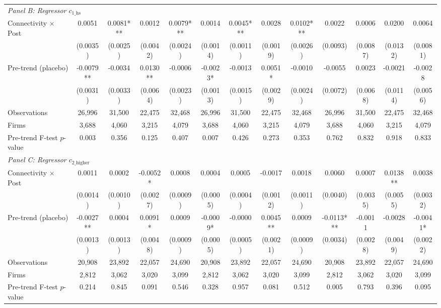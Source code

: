 \begin{table}[H]
{\begin{tabular}{lcccccccccccc}
\multicolumn{13}{l}{\textit{Panel B: Regressor $c_{\text{1\_hs}}$}} \\
\quad Connectivity $\times$ Post & 0.0051 & 0.0081*** & 0.0012 & 0.0079*** & 0.0014 & 0.0045*** & 0.0028 & 0.0102*** & 0.0022 & 0.0006 & 0.0200 & 0.0064 \\
 & (0.0035) & (0.0025) & (0.0042) & (0.0024) & (0.0014) & (0.0011) & (0.0019) & (0.0026) & (0.0093) & (0.0087) & (0.0132) & (0.0081) \\
\quad Pre-trend (placebo) & -0.0079** & -0.0034 & 0.0130** & -0.0006 & -0.0023* & -0.0013 & 0.0051* & -0.0010 & -0.0055 & 0.0023 & -0.0021 & -0.0028 \\
 & (0.0031) & (0.0033) & (0.0064) & (0.0023) & (0.0013) & (0.0015) & (0.0029) & (0.0024) & (0.0072) & (0.0068) & (0.0114) & (0.0056) \\
\quad Observations & 26,996 & 31,500 & 22,475 & 32,468 & 26,996 & 31,500 & 22,475 & 32,468 & 26,996 & 31,500 & 22,475 & 32,468 \\
\quad Firms & 3,688 & 4,060 & 3,215 & 4,079 & 3,688 & 4,060 & 3,215 & 4,079 & 3,688 & 4,060 & 3,215 & 4,079 \\
\quad Pre-trend F-test $p$-value & 0.003 & 0.356 & 0.125 & 0.407 & 0.007 & 0.426 & 0.273 & 0.353 & 0.762 & 0.832 & 0.918 & 0.833 \\[6pt]
\multicolumn{13}{l}{\textit{Panel C: Regressor $c_{\text{2\_higher}}$}} \\
\quad Connectivity $\times$ Post & 0.0011 & 0.0002 & -0.0052* & 0.0008 & 0.0004 & 0.0005 & -0.0017 & 0.0018 & 0.0060 & 0.0007 & 0.0138** & 0.0038 \\
 & (0.0014) & (0.0010) & (0.0027) & (0.0009) & (0.0005) & (0.0004) & (0.0012) & (0.0011) & (0.0040) & (0.0035) & (0.0055) & (0.0032) \\
\quad Pre-trend (placebo) & -0.0027** & 0.0004 & 0.0091* & 0.0009 & -0.0009* & -0.0000 & 0.0045** & 0.0009 & -0.0113*** & -0.0011 & -0.0028 & -0.0041* \\
 & (0.0013) & (0.0013) & (0.0048) & (0.0009) & (0.0005) & (0.0005) & (0.0021) & (0.0009) & (0.0034) & (0.0028) & (0.0049) & (0.0022) \\
\quad Observations & 20,908 & 23,892 & 22,057 & 24,690 & 20,908 & 23,892 & 22,057 & 24,690 & 20,908 & 23,892 & 22,057 & 24,690 \\
\quad Firms & 2,812 & 3,062 & 3,020 & 3,099 & 2,812 & 3,062 & 3,020 & 3,099 & 2,812 & 3,062 & 3,020 & 3,099 \\
\quad Pre-trend F-test $p$-value & 0.214 & 0.845 & 0.091 & 0.546 & 0.328 & 0.957 & 0.081 & 0.512 & 0.005 & 0.793 & 0.396 & 0.095 \\

\end{tabular}}
\end{table}
